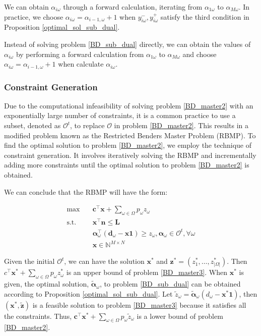 We can obtain $\alpha_{i \omega}$ through a forward calculation, iterating from $\alpha_{1 \omega}$ to $\alpha_{M\omega}$. In practice, we choose $\alpha_{i \omega} = \alpha_{i-1, \omega}+1$ when $y_{i \omega}^{-}, y_{i \omega}^{+}$ satisfy the third condition in Proposition \ref{optimal_sol_sub_dual}.

Instead of solving problem \eqref{BD_sub_dual} directly, we can obtain the values of $\alpha_{i \omega}$ by performing a forward calculation from $\alpha_{1\omega}$ to $\alpha_{M\omega}$ and choose $\alpha_{i \omega} = \alpha_{i-1, \omega}+1$ when calculate $\alpha_{i \omega}$. 

\subsubsection{Constraint Generation}\label{bender_stage}
Due to the computational infeasibility of solving problem \eqref{BD_master2} with an exponentially large number of constraints, it is a common practice to use a subset, denoted as $\mathcal{O}^t$, to replace $\mathcal{O}$ in problem \eqref{BD_master2}. This results in a modified problem known as the Restricted Benders Master Problem (RBMP). To find the optimal solution to problem \eqref{BD_master2}, we employ the technique of constraint generation. It involves iteratively solving the RBMP and incrementally adding more constraints until the optimal solution to problem \eqref{BD_master2} is obtained.

We can conclude that the RBMP will have the form:

\begin{equation}\label{BD_master3}
  \begin{aligned}
    \max \quad & \mathbf{c}^{\intercal} \mathbf{x} + \sum_{\omega \in \Omega} p_{\omega} z_{\omega} \\
    \text {s.t.} \quad & \mathbf{x}^{\intercal} \mathbf{n}  \leq \mathbf{L} \\
    & \bm{\alpha}_{\omega}^{\intercal}(\mathbf{d}_{\omega}- \mathbf{x} \mathbf{1}) \geq z_{\omega}, \bm{\alpha}_{\omega} \in \mathcal{O}^{t}, \forall \omega \\
     & \mathbf{x} \in \mathbb{N}^{M \times N}
  \end{aligned}
\end{equation}

Given the initial $\mathcal{O}^{t}$, we can have the solution $\mathbf{x}^{*}$ and $\mathbf{z}^{*} =(z^{*}_1,\ldots, z^{*}_{|\Omega|})$. Then $c^{\intercal} \mathbf{x}^{*} + \sum_{\omega \in \Omega} p_{\omega} z_{\omega}^{*}$ is an upper bound of problem \eqref{BD_master3}. When $\mathbf{x}^{*}$ is given, the optimal solution, $\bm{\tilde{\alpha}}_{\omega}$, to problem \eqref{BD_sub_dual} can be obtained according to Proposition \ref{optimal_sol_sub_dual}. Let $\tilde{z}_{\omega} = \bm{\tilde{\alpha}}_{\omega}(d_{\omega} - \mathbf{x}^{*} \mathbf{1})$, then $(\mathbf{x}^{*}, \mathbf{\tilde{z}})$ is a feasible solution to problem \eqref{BD_master3} because it satisfies all the constraints. Thus, $\mathbf{c}^{\intercal} \mathbf{x}^{*} + \sum_{\omega \in \Omega} p_{\omega} \tilde{z}_{\omega}$ is a lower bound of problem \eqref{BD_master2}.

